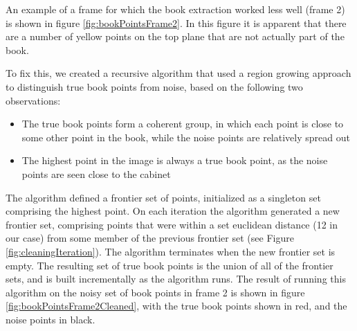 An example of a frame for which the book extraction worked less well (frame 2) is shown in figure \ref{fig:bookPointsFrame2}. In this figure it is apparent that there are a number of yellow points on the top plane that are not actually part of the book.

To fix this, we created a recursive algorithm that used a region growing approach to distinguish true book points from noise, based on the following two observations:

\begin{itemize}
	\item The true book points form a coherent group, in which each point is close to some other point in the book, while the noise points are relatively spread out
	\item The highest point in the image is always a true book point, as the noise points are seen close to the cabinet
\end{itemize}

The algorithm defined a frontier set of points, initialized as a singleton set comprising the highest point. On each iteration the algorithm generated a new frontier set, comprising points that were within a set euclidean distance (12 in our case) from some member of the previous frontier set (see Figure \ref{fig:cleaningIteration}). The algorithm terminates when the new frontier set is empty. The resulting set of true book points is the union of all of the frontier sets, and is built incrementally as the algorithm runs. The result of running this algorithm on the noisy set of book points in frame 2 is shown in figure \ref{fig:bookPointsFrame2Cleaned}, with the true book points shown in red, and the noise points in black.

